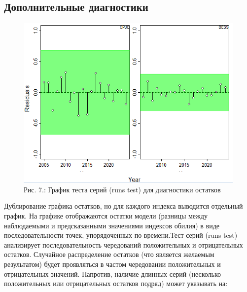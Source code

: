\documentclass[
  letterpaper,
  DIV=11,
  numbers=noendperiod]{scrreprt}
\newenvironment{Shaded}{\begin{snugshade}}{\end{snugshade}}
\newcommand{\AttributeTok}[1]{\textcolor[rgb]{0.40,0.45,0.13}{#1}}
\newcommand{\CommentTok}[1]{\textcolor[rgb]{0.37,0.37,0.37}{#1}}
\newcommand{\ConstantTok}[1]{\textcolor[rgb]{0.56,0.35,0.01}{#1}}
\newcommand{\FunctionTok}[1]{\textcolor[rgb]{0.28,0.35,0.67}{#1}}
\newcommand{\NormalTok}[1]{\textcolor[rgb]{0.00,0.23,0.31}{#1}}
\newcommand{\SpecialCharTok}[1]{\textcolor[rgb]{0.37,0.37,0.37}{#1}}
\newcommand{\StringTok}[1]{\textcolor[rgb]{0.13,0.47,0.30}{#1}}
\begin{document}
\subsection{Дополнительные
диагностики}\label{ux434ux43eux43fux43eux43bux43dux438ux442ux435ux43bux44cux43dux44bux435-ux434ux438ux430ux433ux43dux43eux441ux442ux438ux43aux438}

\begin{Shaded}
\end{Shaded}

\begin{figure}[H]

{\centering \includegraphics[width=0.6\linewidth,height=\textheight,keepaspectratio]{images/JABBA7.png}

}

\caption{Рис. 7.: График теста серий (runs test) для диагностики
остатков}

\end{figure}%

Дублирование графика остатков, но для каждого индекса выводится
отдельный график. На графике отображаются остатки модели (разницы между
наблюдаемыми и предсказанными значениями индексов обилия) в виде
последовательности точек, упорядоченных по времени.Тест серий (runs
test) анализирует последовательность чередований положительных и
отрицательных остатков. Случайное распределение остатков (что является
желаемым результатом) будет проявляться в частом чередовании
положительных и отрицательных значений. Напротив, наличие длинных серий
(несколько положительных или отрицательных остатков подряд) может
указывать на:
\end{document}
